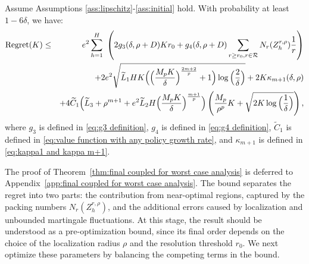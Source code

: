 \documentclass[final,supplement]{siamart251216}
\begin{document}
\begin{theorem}\label{thm:final coupled for worst case analysis}
Assume Assumptions \ref{ass:lipschitz}-\ref{ass:initial} hold.  With probability at least $1-6\delta$, we have: 
\begin{eqnarray}
      {\rm Regret}(K)&\leq& e^{2} \sum_{h=1}^{H}\,\,\left(2g_{3}(\delta,\rho+D)Kr_{0}+g_{4}(\delta,\rho+D)\sum_{r \geq r_{0}, r\in \mathcal{R}}N_{r}(Z_{h}^{r,\rho})\frac{1}{r}\right)\nonumber\\
        &&+2e^{2}\sqrt{\widetilde{L}_{1}HK\Big(\Big(\frac{M_{p}K}{\delta}\Big)^{\frac{2m+2}{p}} +1\Big)\log\Big(\frac{2}{\delta}\Big)}+2K\kappa_{m+1}(\delta,\rho)\nonumber\\
&&+4\widetilde{C}_1\Big(\widetilde{L}_{3}+\rho^{m+1}+e^{2}\widetilde{L}_{2}H\Big(\frac{M_{p}K}{\delta}\Big)^{\frac{m+1}{p}} \Big)\left(\frac{M_{p}}{\rho^{p}}K+\sqrt{2K\log\Big(\frac{1}{\delta}\Big)}\right)\label{eq:final regret before order balance},
\end{eqnarray}
where $g_{3}$ is defined in \eqref{eq:g3 definition}, $g_{4}$ is defined in \eqref{eq:g4 definition},  $\widetilde{C}_1$ is defined in \eqref{eq:value function with any policy growth rate}, and $\kappa_{m+1}$ is defined in \eqref{eq:kappa1 and kappa m+1}.

\end{theorem}
The proof of Theorem~\ref{thm:final coupled for worst case analysis} is deferred to Appendix~\ref{app:final coupled for worst case analysis}. The bound separates the regret into two parts: the contribution from near-optimal regions, captured by the packing numbers \(N_r(Z_h^{r,\rho})\), and the additional errors caused by localization and unbounded martingale fluctuations. At this stage, the result should be understood as a pre-optimization bound, since its final order depends on the choice of the localization radius
\(\rho\) and the resolution threshold \(r_0\). We next optimize these parameters by balancing the competing terms in the bound.
\end{document}
